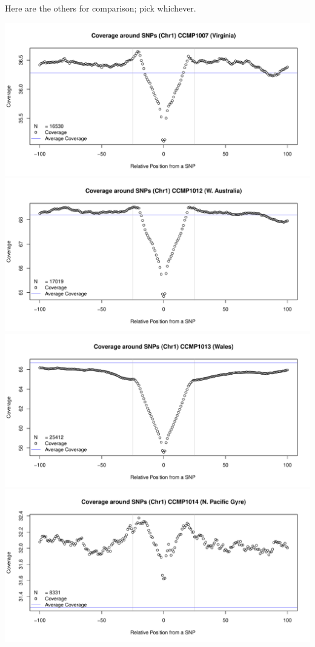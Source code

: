 \documentclass{article}\usepackage[]{graphicx}\usepackage[]{color}
\begin{document}
Here are the others for comparison; pick whichever.

\noindent%
\includegraphics[width=\linewidth]{FigS5-SNPdip-figs/snpdip-chr1-1007.pdf}\\
\includegraphics[width=\linewidth]{FigS5-SNPdip-figs/snpdip-chr1-1012.pdf}\\
\includegraphics[width=\linewidth]{FigS5-SNPdip-figs/snpdip-chr1-1013.pdf}\\
\includegraphics[width=\linewidth]{FigS5-SNPdip-figs/snpdip-chr1-1014.pdf}\\
\end{document}
